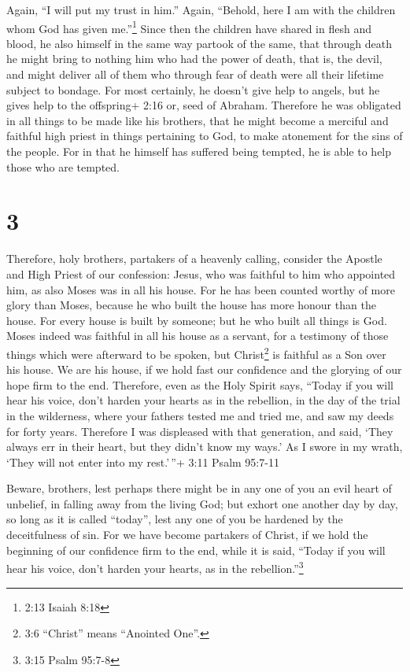  Again, ``I will put my trust in him.'' Again, ``Behold,
here I am with the children whom God has given me.''\footnote{2:13
  Isaiah 8:18}  Since then the children have shared in
flesh and blood, he also himself in the same way partook of the same,
that through death he might bring to nothing him who had the power of
death, that is, the devil,  and might deliver all of them
who through fear of death were all their lifetime subject to bondage.
 For most certainly, he doesn't give help to angels, but he
gives help to the offspring+ 2:16 or, seed of Abraham. 
Therefore he was obligated in all things to be made like his brothers,
that he might become a merciful and faithful high priest in things
pertaining to God, to make atonement for the sins of the people.
 For in that he himself has suffered being tempted, he is
able to help those who are tempted.

\hypertarget{section-2}{%
\section{3}\label{section-2}}

 Therefore, holy brothers, partakers of a heavenly calling,
consider the Apostle and High Priest of our confession: Jesus,
 who was faithful to him who appointed him, as also Moses
was in all his house.  For he has been counted worthy of
more glory than Moses, because he who built the house has more honour
than the house.  For every house is built by someone; but he
who built all things is God.  Moses indeed was faithful in
all his house as a servant, for a testimony of those things which were
afterward to be spoken,  but Christ\footnote{3:6 ``Christ''
  means ``Anointed One''.} is faithful as a Son over his house. We are
his house, if we hold fast our confidence and the glorying of our hope
firm to the end.  Therefore, even as the Holy Spirit says,
``Today if you will hear his voice,  don't harden your
hearts as in the rebellion, in the day of the trial in the wilderness,
 where your fathers tested me and tried me, and saw my deeds
for forty years.  Therefore I was displeased with that
generation, and said, `They always err in their heart, but they didn't
know my ways.'  As I swore in my wrath, `They will not
enter into my rest.'\,''+ 3:11 Psalm 95:7-11

 Beware, brothers, lest perhaps there might be in any one
of you an evil heart of unbelief, in falling away from the living God;
 but exhort one another day by day, so long as it is called
``today'', lest any one of you be hardened by the deceitfulness of sin.
 For we have become partakers of Christ, if we hold the
beginning of our confidence firm to the end,  while it is
said, ``Today if you will hear his voice, don't harden your hearts, as
in the rebellion.''\footnote{3:15 Psalm 95:7-8}

